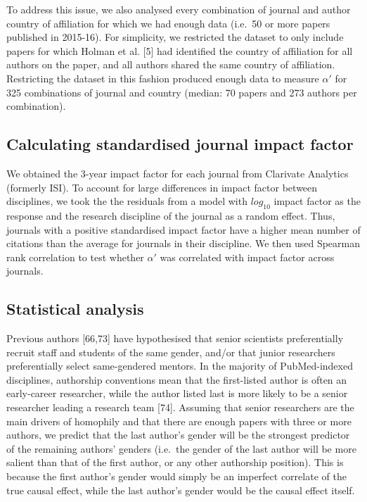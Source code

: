 \documentclass[12pt,]{article}
\begin{document}
To address this issue, we also analysed every combination of journal and
author country of affiliation for which we had enough data (i.e.~50 or
more papers published in 2015-16). For simplicity, we restricted the
dataset to only include papers for which Holman et al. {[}5{]} had
identified the country of affiliation for all authors on the paper, and
all authors shared the same country of affiliation. Restricting the
dataset in this fashion produced enough data to measure \(\alpha'\) for
325 combinations of journal and country (median: 70 papers and 273
authors per combination).

\subsection{Calculating standardised journal impact
factor}\label{calculating-standardised-journal-impact-factor}

We obtained the 3-year impact factor for each journal from Clarivate
Analytics (formerly ISI). To account for large differences in impact
factor between disciplines, we took the the residuals from a model with
\(log_{10}\) impact factor as the response and the research discipline
of the journal as a random effect. Thus, journals with a positive
standardised impact factor have a higher mean number of citations than
the average for journals in their discipline. We then used Spearman rank
correlation to test whether \(\alpha'\) was correlated with impact
factor across journals.

\subsection{Statistical analysis}\label{statistical-analysis}

Previous authors {[}66,73{]} have hypothesised that senior scientists
preferentially recruit staff and students of the same gender, and/or
that junior researchers preferentially select same-gendered mentors. In
the majority of PubMed-indexed disciplines, authorship conventions mean
that the first-listed author is often an early-career researcher, while
the author listed last is more likely to be a senior researcher leading
a research team {[}74{]}. Assuming that senior researchers are the main
drivers of homophily and that there are enough papers with three or more
authors, we predict that the last author's gender will be the strongest
predictor of the remaining authors' genders (i.e.~the gender of the last
author will be more salient than that of the first author, or any other
authorship position). This is because the first author's gender would
simply be an imperfect correlate of the true causal effect, while the
last author's gender would be the causal effect itself.
\end{document}
